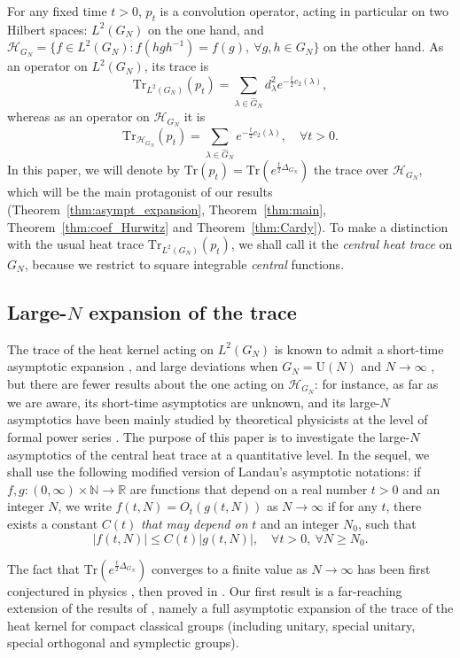 \documentclass[11pt,a4paper,reqno]{article}
\theoremstyle{definition}
\theoremstyle{remark}
\newcommand\U{{\mathrm U}}
\newcommand\N{{\mathbb N}}
\newcommand\R{\mathbb{R}}
\newcommand\Tr{\mathrm{Tr}}
\begin{document}
For any fixed time $t>0$, $p_t$ is a convolution operator, acting in particular on two Hilbert spaces: $L^2(G_N)$ on the one hand, and $\mathcal{H}_{G_N}=\{f\in L^2(G_N):f(hgh^{-1})=f(g),\ \forall g,h\in G_N\}$ on the other hand. As an operator on $L^2(G_N)$, its trace is
\[
\Tr_{L^2(G_N)}(p_t)=\sum_{\lambda\in\widehat{G}_N}d_\lambda^2e^{-\frac{t}{2}c_2(\lambda)},
\]
whereas as an operator on $\mathcal{H}_{G_N}$ it is
\begin{equation}\label{eq:hk_trace_ini}
\Tr_{\mathcal{H}_{G_N}}(p_t)=\sum_{\lambda\in\widehat{G}_N}e^{-\frac{t}{2}c_2(\lambda)},\quad \forall t>0.
\end{equation}
In this paper, we will denote by $\Tr(p_t)=\Tr(e^{\frac{t}{2}\Delta_{G_N}})$ the trace over $\mathcal{H}_{G_N}$, which will be the main protagonist of our results (Theorem~\ref{thm:asympt_expansion}, Theorem~\ref{thm:main}, Theorem~\ref{thm:coef_Hurwitz} and Theorem~\ref{thm:Cardy}). To make a distinction with the usual heat trace $\Tr_{L^2(G_N)}(p_t)$, we shall call it the \emph{central heat trace} on $G_N$, because we restrict to square integrable \emph{central} functions.

\subsection{Large-$N$ expansion of the trace}

The trace of the heat kernel acting on $L^2(G_N)$ is known to admit a short-time asymptotic expansion \cite{Feg}, and large deviations when $G_N=\U(N)$ and $N\to\infty$ \cite{LevMai2}, but there are fewer results about the one acting on $\mathcal{H}_{G_N}$: for instance, as far as we are aware, its short-time asymptotics are unknown, and its large-$N$ asymptotics have been mainly studied by theoretical physicists at the level of formal power series \cite{GT,GT2,Dij}. The purpose of this paper is to investigate the large-$N$ asymptotics of the central heat trace at a quantitative level. In the sequel, we shall use the following modified version of Landau's asymptotic notations: if $f,g:(0,\infty)\times \N\to\R$ are functions that depend on a real number $t>0$ and an integer $N$, we write $f(t,N)=O_t(g(t,N))$ as $N\to\infty$ if for any $t$, there exists a constant $C(t)$ \emph{that may depend on} $t$ and an integer $N_0$, such that
\[
\vert f(t,N)\vert \leq C(t)\vert g(t,N)\vert,\quad \forall t>0,\ \forall N\geq N_0.
\]

The fact that $\Tr(e^{\frac{t}{2}\Delta_{G_N}})$ converges to a finite value as $N\to\infty$ has been first conjectured in physics \cite{Gro,Dou}, then proved in \cite{Lem,DL}. Our first result is a far-reaching extension of the results of \cite{DL}, namely a full asymptotic expansion of the trace of the heat kernel for compact classical groups (including unitary, special unitary, special orthogonal and symplectic groups). 
\end{document}
